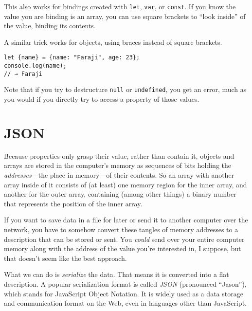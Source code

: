 This also works for bindings created with \lstinline`let`, \lstinline`var`, or \lstinline`const`. If you know the value you are binding is an array, you can use square brackets to ``look inside'' of the value, binding its contents.

A similar trick works for objects, using braces instead of square brackets.

\begin{lstlisting}
let {name} = {name: "Faraji", age: 23};
console.log(name);
// → Faraji
\end{lstlisting}
\noindent{}

Note that if you try to destructure \lstinline`null` or \lstinline`undefined`, you get an error, much as you would if you directly try to access a property of those values.

\section{JSON}

Because properties only grasp their value, rather than contain it, objects and arrays are stored in the computer's memory as sequences of bits holding the \emph{addresses}—the place in memory—of their contents. So an array with another array inside of it consists of (at least) one memory region for the inner array, and another for the outer array, containing (among other things) a binary number that represents the position of the inner array.

If you want to save data in a file for later or send it to another computer over the network, you have to somehow convert these tangles of memory addresses to a description that can be stored or sent. You \emph{could} send over your entire computer memory along with the address of the value you're interested in, I suppose, but that doesn't seem like the best approach.

What we can do is \emph{serialize} the data. That means it is converted into a flat description. A popular serialization format is called \emph{JSON} (pronounced ``Jason''), which stands for JavaScript Object Notation. It is widely used as a data storage and communication format on the Web, even in languages other than JavaScript.

